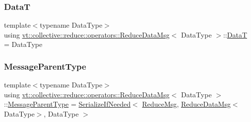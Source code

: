 \mbox{\label{structvt_1_1collective_1_1reduce_1_1operators_1_1_reduce_data_msg_a33b96667b96604c31bf0986b52e0eee3}} 
\subsubsection{\texorpdfstring{DataT}{DataT}}
{\footnotesize\ttfamily template$<$typename Data\+Type$>$ \\
using \hyperlink{structvt_1_1collective_1_1reduce_1_1operators_1_1_reduce_data_msg}{vt\+::collective\+::reduce\+::operators\+::\+Reduce\+Data\+Msg}$<$ Data\+Type $>$\+::\hyperlink{structvt_1_1collective_1_1reduce_1_1operators_1_1_reduce_data_msg_a33b96667b96604c31bf0986b52e0eee3}{DataT} =  Data\+Type}

\mbox{\label{structvt_1_1collective_1_1reduce_1_1operators_1_1_reduce_data_msg_a6b5182cf48445f9d03dc6e5905a4eba1}} 
\subsubsection{\texorpdfstring{Message\+Parent\+Type}{MessageParentType}}
{\footnotesize\ttfamily template$<$typename Data\+Type$>$ \\
using \hyperlink{structvt_1_1collective_1_1reduce_1_1operators_1_1_reduce_data_msg}{vt\+::collective\+::reduce\+::operators\+::\+Reduce\+Data\+Msg}$<$ Data\+Type $>$\+::\hyperlink{structvt_1_1collective_1_1reduce_1_1operators_1_1_reduce_data_msg_a6b5182cf48445f9d03dc6e5905a4eba1}{Message\+Parent\+Type} =  \hyperlink{namespacevt_a0a4ad8c256fcffa564e9fa7800e4b495}{Serialize\+If\+Needed}$<$ \hyperlink{structvt_1_1collective_1_1reduce_1_1_reduce_msg}{Reduce\+Msg}, \hyperlink{structvt_1_1collective_1_1reduce_1_1operators_1_1_reduce_data_msg}{Reduce\+Data\+Msg}$<$Data\+Type$>$, Data\+Type $>$}



